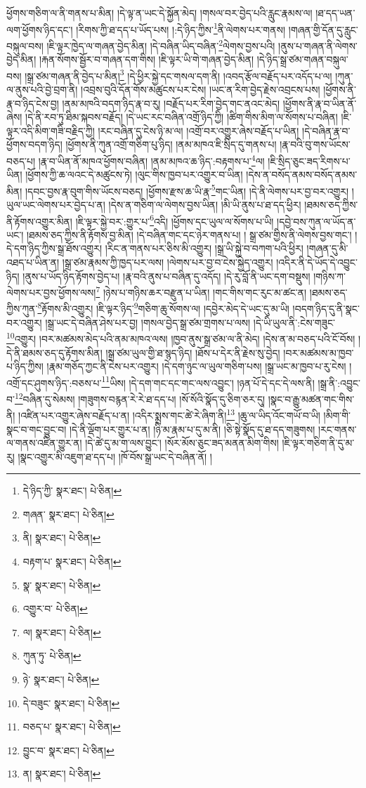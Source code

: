 ཕྱོགས་གཅིག་ལ་ནི་གནས་པ་མིན། །དེ་ལྟ་ན་ཡང་དེ་སྐྱོན་མེད། །གསལ་བར་བྱེད་པའི་རླུང་རྣམས་ལ། །ཐ་དད་ཡན་ལག་ཕྱོགས་ཉིད་དང་། །རིགས་ཀྱི་ཐ་དད་པ་ཡོད་པས། །:དེ་ཉིད་ཀྱིས་\footnote{དེ་ཉིད་ཀྱི་  སྣར་ཐང་།  པེ་ཅིན། }ནི་ལེགས་པར་གནས། །གཞན་གྱི་དོན་དུ་རླུང་བསྐུལ་བས། །ཇི་ལྟར་ཁྱེད་ལ་གཞན་བྱེད་མིན། །དེ་བཞིན་ཡིད་བཞིན་\footnote{གཞན་  སྣར་ཐང་།  པེ་ཅིན། }ལེགས་བྱས་པའི། །ནུས་པ་གཞན་ནི་ལེགས་བྱེད་མིན། །རྐན་སོགས་སྦྱོར་བ་གཞན་དག་གིས། །ཇི་ལྟར་ཡི་གེ་གཞན་བྱེད་མིན། །དེ་ཉིད་སྒྲ་ཙམ་གཞན་བསྐུལ་བས། །སྒྲ་ཙམ་གཞན་ནི་བྱེད་པ་མིན།\footnote{ནི།  སྣར་ཐང་།  པེ་ཅིན། } །དེ་ཕྱིར་སྐྱེ་དང་གསལ་དག་ནི། །འབད་རྩོལ་བརྗོད་པར་འདོད་པ་ལ། །ཀུན་ལ་ནུས་པའི་བྱེ་བྲག་ནི། །འབྲས་བུའི་དོན་གོས་མཚུངས་པར་ངེས། །ཡང་ན་རིག་བྱེད་རྗེས་འབྲངས་པས། །ཕྱོགས་ནི་རྣ་བ་ཉིད་ངེས་བྱ། །ནམ་མཁའི་བདག་ཉིད་རྣ་བ་རུ། །བརྗོད་པར་རིག་བྱེད་གང་ནའང་མེད། །ཕྱོགས་ནི་རྣ་བ་ཡིན་ནོ་ཞེས། །དེ་ནི་རབ་ཏུ་ཐིམ་སྐབས་བརྗོད། །དེ་ཡང་རང་བཞིན་འགྲོ་ཉིད་ཀྱི། །ཚིག་གིས་མིག་ལ་སོགས་པ་བཞིན། །ཇི་ལྟར་འདི་མིག་གཟི་བརྗིད་ཀྱི། །རང་བཞིན་དུ་ངེས་ཉི་མ་ལ། །འགྲོ་བར་འགྱུར་ཞེས་བརྗོད་པ་ཡིན། །དེ་བཞིན་རྣ་བ་ཕྱོགས་བདག་ཉིད། །ཕྱོགས་ནི་ཀུན་འགྲོ་གཅིག་པུ་ཉིད། །ནམ་མཁའ་ཇི་སྲིད་དུ་གནས་པ། །རྣ་བའི་བུ་གས་ཡོངས་བཅད་པ། །རྣ་བ་ཡིན་ནོ་མཁའ་ཕྱོགས་བཞིན། །ནམ་མཁའ་ཆ་ཉིད་:བརྟགས་པ་\footnote{བརྟག་པ་  སྣར་ཐང་།  པེ་ཅིན། }ལ། །ཇི་སྲིད་ཅུང་ཟད་རིགས་པ་ཡིན། །ཕྱོགས་ཀྱི་ཆ་ལའང་དེ་མཚུངས་ཏེ། །ལུང་གིས་ཁྱབ་པར་འགྱུར་བ་ཡིན། །དེས་ན་བསོད་ནམས་བསོད་ནམས་མིན། །དབང་བྱས་རྣ་བུག་གིས་ཡོངས་བཅད། །ཕྱོགས་རྫས་ཆ་ཡི་རྣ་\footnote{སྣ་  སྣར་ཐང་།  པེ་ཅིན། }གང་ཡིན། །དེ་ནི་ལེགས་པར་བྱ་བར་འགྱུར། །ཡུལ་ཡང་ལེགས་པར་བྱེད་པ་ན། །དེས་ན་གཅིག་ལ་ལེགས་བྱས་ཡིན། །མི་ཡི་ནུས་པ་ཐ་དད་ཕྱིར། །ཐམས་ཅད་ཀྱིས་ནི་རྟོགས་འགྱུར་མིན། །ཇི་ལྟར་སྐྱེ་བར་:གྱུར་པ་\footnote{འགྱུར་བ་  པེ་ཅིན། }འདི། །ཕྱོགས་དང་ཡུལ་ལ་སོགས་པ་ཡི། །དབྱེ་བས་ཀུན་ལ་ཡོད་ན་ཡང་། །ཐམས་ཅད་ཀྱིས་ནི་རྟོགས་བྱ་མིན། །དེ་བཞིན་གང་དང་ཉེར་གནས་པ། །
སྒྲ་ཙམ་གྱིས་ནི་ལེགས་བྱས་གང་། །དེ་དག་ཉིད་ཀྱིས་སྒྲ་ཐོས་འགྱུར། །རིང་ན་གནས་པར་ཅིས་མི་འགྱུར། །སྒྲ་ཡི་སྐྱེ་བ་བཀག་པའི་ཕྱིར། །གཞན་དུ་མི་འཐད་པ་ཡིན་ན། །སྒྲ་ཙམ་རྣམས་ཀྱི་ཁྱད་པར་ལས། །ལེགས་པར་བྱ་བ་ངེས་སྐྱེད་འགྱུར། །འདིར་ནི་དེ་ཡོད་དེ་འབྱུང་ཉིད། །ནུས་པ་ཡོད་ཉིད་རྟོགས་བྱེད་པ། །རྣ་བའི་ནུས་པ་བཞིན་དུ་འདོད། །དེ་རུ་བློ་ནི་ཡང་དག་བསྡུས། །གཉིས་ཀ་ལེགས་པར་བྱས་ཕྱོགས་ལས།\footnote{ལ།  སྣར་ཐང་།  པེ་ཅིན། } །ཉེས་པ་གཉིས་ཆར་བརྫུན་པ་ཡིན། །གང་གིས་གང་རུང་མ་ཚང་ན། །ཐམས་ཅད་ཀྱིས་ཀུན་\footnote{ཀུན་ཏུ་  པེ་ཅིན། }རྟོགས་མི་འགྱུར། །ཇི་ལྟར་ཉིད་\footnote{ཉེ་  སྣར་ཐང་།  པེ་ཅིན། }གཅིག་ཆུ་སོགས་ལ། །དབྱེར་མེད་དེ་ཡང་དུ་མ་ཡི། །བདག་ཉིད་དུ་ནི་སྣང་བར་འགྱུར། །སྒྲ་ཡང་དེ་བཞིན་ཤེས་པར་བྱ། །གསལ་བྱེད་སྒྲ་ཙམ་གྲགས་པ་ལས། །དེ་ཡི་ཡུལ་ནི་:ངེས་གཟུང་\footnote{དེ་བཟུང་  སྣར་ཐང་།  པེ་ཅིན། }འགྱུར། །བར་མཚམས་མེད་པའི་ནམ་མཁའ་ལས། །ཁྱབ་ནུས་སྒྲ་ཙམ་ལ་ནི་མེད། །དེས་ན་མ་བཅད་པའི་ངོ་བོས། །དེ་ནི་ཐམས་ཅད་དུ་རྟོགས་མིན། །སྒྲ་ཙམ་ཡུལ་གྱི་ཐ་སྙད་ཉིད། །ཐོས་པ་དེར་ནི་རྗེས་སུ་བྱེད། །བར་མཚམས་མ་ཁྱབ་པ་ཉིད་ཀྱིས། །རྣམ་གཅོད་ཀྱང་ནི་ངེས་པར་འགྱུར། །དེ་དག་ཉུང་ལ་ཡུལ་གཅིག་པས། །སྒྲ་ཡང་མ་ཁྱབ་པ་རུ་ངེས། །འགྲོ་དང་ཤུགས་ཉིད་:བཅས་པ་\footnote{བཅད་པ་  སྣར་ཐང་།  པེ་ཅིན། }ཡིས། །དེ་དག་གང་དང་གང་ལས་འབྱུང་། །ཉན་པོ་དེ་དང་དེ་ལས་ནི། །སྒྲ་ནི་:འབྱུང་བ་\footnote{བྱུང་བ་  སྣར་ཐང་།  པེ་ཅིན། }བཞིན་དུ་སེམས། །གཟུགས་བརྙན་རེ་རེ་ཐ་དད་པ། །སོ་སོའི་སྣོད་དུ་ཅིག་ཅར་དུ། །སྣང་བ་རྒྱུ་མཚན་གང་གིས་ནི། །འཛིན་པར་འགྱུར་ཞེས་བརྗོད་པ་ན། །འདིར་སྨྲས་གང་ཚེ་རེ་ཞིག་ནི།\footnote{ན།  སྣར་ཐང་།  པེ་ཅིན། } །ཆུ་ལ་ཡིད་འོང་གཡོ་བ་ཡི། །མིག་གི་སྣང་བ་གང་བྱུང་བ། །དེ་ནི་ལྡོག་པར་གྱུར་པ་ན། །ཉི་མ་རྣམ་པ་དུ་མ་ནི། །ཅི་སྟེ་སྣོད་དུ་ཐ་དད་གཟུགས། །རང་གནས་ལ་གནས་འཛིན་གྱུར་ན། །དེ་ཚེ་དུ་མ་ག་ལས་བྱུང་། །སོར་མོས་ཅུང་ཟད་མནན་མིག་གིས། །ཇི་ལྟར་གཅིག་ནི་དུ་མ་རུ། །སྣང་འགྱུར་མི་འཇུག་ཐ་དད་པ། །ཁོ་བོས་སྒྲ་ཡང་དེ་བཞིན་ནོ། །
